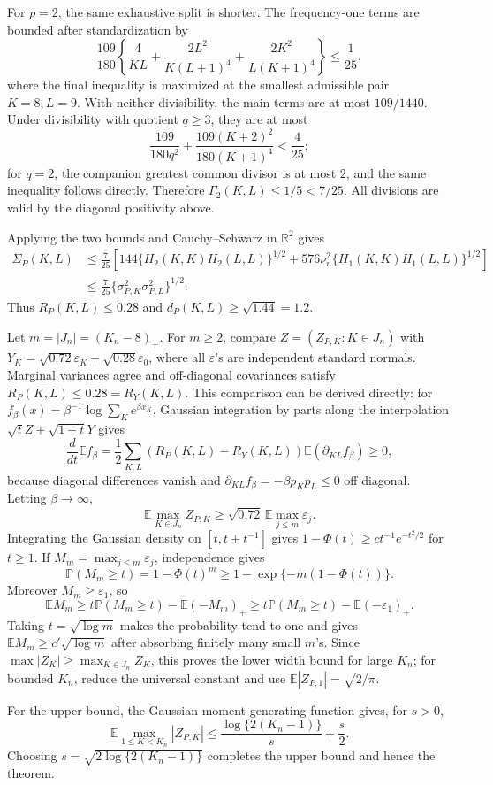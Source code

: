 For \(p=2\), the same exhaustive split is shorter.  The frequency-one terms are bounded after standardization by
\[
 \frac{109}{180}\left\{\frac4{KL}
 +\frac{2L^2}{K(L+1)^4}+\frac{2K^2}{L(K+1)^4}\right\}
 \leq\frac1{25},
\]
where the final inequality is maximized at the smallest admissible pair \(K=8,L=9\).  With neither divisibility, the main terms are at most \(109/1440\).  Under divisibility with quotient \(q\geq3\), they are at most
\[
 \frac{109}{180q^2}+\frac{109(K+2)^2}{180(K+1)^4}<\frac4{25};
\]
for \(q=2\), the companion greatest common divisor is at most \(2\), and the same inequality follows directly.  Therefore \(\Gamma_2(K,L)\leq1/5<7/25\).  All divisions are valid by the diagonal positivity above.

Applying the two bounds and Cauchy--Schwarz in \(\mathbb R^2\) gives
\[
 \begin{aligned}
 \Sigma_P(K,L)
 &\leq\frac7{25}\left[144\{H_2(K,K)H_2(L,L)\}^{1/2}
 +576\nu_n^2\{H_1(K,K)H_1(L,L)\}^{1/2}\right]\\
 &\leq\frac7{25}\{\sigma_{P,K}^2\sigma_{P,L}^2\}^{1/2}.
 \end{aligned}
\]
Thus \(R_P(K,L)\leq0.28\) and \(d_P(K,L)\geq\sqrt{1.44}=1.2\).

Let \(m=|J_n|=(K_n-8)_+\).  For \(m\geq2\), compare \(Z=(Z_{P,K}:K\in J_n)\) with
\(Y_K=\sqrt{0.72}\varepsilon_K+\sqrt{0.28}\varepsilon_0\), where all \(\varepsilon\)'s are independent standard normals.  Marginal variances agree and off-diagonal covariances satisfy \(R_P(K,L)\leq0.28=R_Y(K,L)\).  This comparison can be derived directly: for
\(f_\beta(x)=\beta^{-1}\log\sum_Ke^{\beta x_K}\), Gaussian integration by parts along the interpolation \(\sqrt tZ+\sqrt{1-t}Y\) gives
\[
 \frac d{dt}\mathbb Ef_\beta
 =\frac12\sum_{K,L}(R_P(K,L)-R_Y(K,L))
 \mathbb E(\partial_{KL}f_\beta)\geq0,
\]
because diagonal differences vanish and \(\partial_{KL}f_\beta=-\beta p_Kp_L\leq0\) off diagonal.  Letting \(\beta\to\infty\),
\[
 \mathbb E\max_{K\in J_n}Z_{P,K}
 \geq\sqrt{0.72}\,\mathbb E\max_{j\leq m}\varepsilon_j.
\]
Integrating the Gaussian density on \([t,t+t^{-1}]\) gives
\(1-\Phi(t)\geq ct^{-1}e^{-t^2/2}\) for \(t\geq1\).  If \(M_m=\max_{j\leq m}\varepsilon_j\), independence gives
\[
 \mathbb P(M_m\geq t)=1-\Phi(t)^m
 \geq1-\exp\{-m(1-\Phi(t))\}.
\]
Moreover \(M_m\geq\varepsilon_1\), so
\[
 \mathbb EM_m\geq t\mathbb P(M_m\geq t)-\mathbb E(-M_m)_+
 \geq t\mathbb P(M_m\geq t)-\mathbb E(-\varepsilon_1)_+.
\]
Taking \(t=\sqrt{\log m}\) makes the probability tend to one and gives
\(\mathbb EM_m\geq c'\sqrt{\log m}\) after absorbing finitely many small \(m\)'s.  Since \(\max|Z_K|\geq\max_{K\in J_n}Z_K\), this proves the lower width bound for large \(K_n\); for bounded \(K_n\), reduce the universal constant and use \(\mathbb E|Z_{P,1}|=\sqrt{2/\pi}\).

For the upper bound, the Gaussian moment generating function gives, for \(s>0\),
\[
 \mathbb E\max_{1\leq K<K_n}|Z_{P,K}|
 \leq\frac{\log\{2(K_n-1)\}}s+\frac s2.
\]
Choosing \(s=\sqrt{2\log\{2(K_n-1)\}}\) completes the upper bound and hence the theorem.